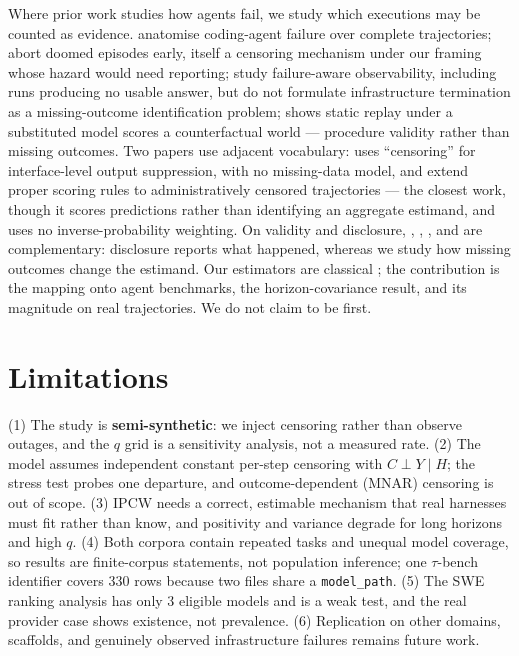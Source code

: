 \documentclass[letterpaper]{article}
\begin{document}
Where prior work studies how agents fail, we study which executions may be
counted as evidence. \citet{zhao2026failure} anatomise coding-agent failure over
complete trajectories; \citet{ruan2026doomed} abort doomed episodes early, itself
a censoring mechanism under our framing whose hazard would need reporting;
\citet{li2026early} study failure-aware observability, including runs producing
no usable answer, but do not formulate infrastructure termination as a
missing-outcome identification problem; \citet{gonuguntla2026replay} shows
static replay under a substituted model scores a counterfactual world ---
procedure validity rather than missing outcomes. Two papers use adjacent
vocabulary: \citet{wang2026interface} uses ``censoring'' for interface-level
output suppression, with no missing-data model, and \citet{raghu2026proper}
extend proper scoring rules to administratively censored trajectories --- the
closest work, though it scores predictions rather than identifying an aggregate
estimand, and uses no inverse-probability weighting. On validity and disclosure,
\citet{kapoor2024agentsthatmatter}, \citet{weidinger2025evalscience},
\citet{zhu2026guardrails}, \citet{chen2026judge} and
\citet{moghadasi2026disclose} are complementary: disclosure reports what
happened, whereas we study how missing outcomes change the estimand. Our
estimators are classical
\citep{horvitz1952generalization,robins1994estimation,manski1990nonparametric};
the contribution is the mapping onto agent benchmarks, the horizon-covariance
result, and its magnitude on real trajectories. We do not claim to be first.

\section{Limitations}

(1) The study is \textbf{semi-synthetic}: we inject censoring rather than
observe outages, and the $q$ grid is a sensitivity analysis, not a measured
rate. (2) The model assumes independent constant per-step censoring with
$C\perp Y\mid H$; the stress test probes one departure, and outcome-dependent
(MNAR) censoring is out of scope. (3) IPCW needs a correct, estimable mechanism
that real harnesses must fit rather than know, and positivity and variance
degrade for long horizons and high $q$. (4) Both corpora contain repeated tasks
and unequal model coverage, so results are finite-corpus statements, not
population inference; one $\tau$-bench identifier covers 330 rows because two
files share a \texttt{model\_path}. (5) The SWE ranking analysis has only 3
eligible models and is a weak test, and the real provider case shows existence,
not prevalence. (6) Replication on other domains, scaffolds, and genuinely
observed infrastructure failures remains future work.
\end{document}

